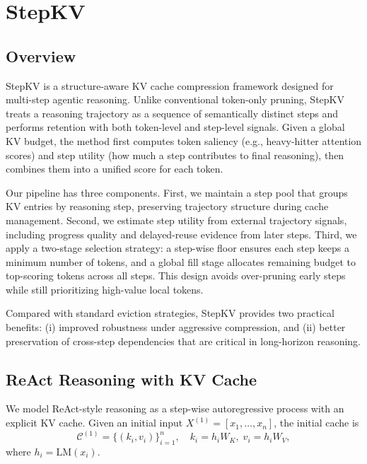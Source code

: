 \documentclass[11pt]{article}
\begin{document}
\section{StepKV}

\subsection{Overview}

StepKV is a structure-aware KV cache compression framework designed for multi-step agentic reasoning. Unlike conventional token-only pruning, StepKV treats a reasoning trajectory as a sequence of semantically distinct steps and performs retention with both token-level and step-level signals. Given a global KV budget, the method first computes token saliency (e.g., heavy-hitter attention scores) and step utility (how much a step contributes to final reasoning), then combines them into a unified score for each token.

Our pipeline has three components. First, we maintain a step pool that groups KV entries by reasoning step, preserving trajectory structure during cache management. Second, we estimate step utility from external trajectory signals, including progress quality and delayed-reuse evidence from later steps. Third, we apply a two-stage selection strategy: a step-wise floor ensures each step keeps a minimum number of tokens, and a global fill stage allocates remaining budget to top-scoring tokens across all steps. This design avoids over-pruning early steps while still prioritizing high-value local tokens.

Compared with standard eviction strategies, StepKV provides two practical benefits: (i) improved robustness under aggressive compression, and (ii) better preservation of cross-step dependencies that are critical in long-horizon reasoning.

\subsection{ReAct Reasoning with KV Cache}

We model ReAct-style reasoning as a step-wise autoregressive process with an explicit KV cache. Given an initial input $X^{(1)} = [x_1, \dots, x_n]$, the initial cache is
\begin{equation}
\mathcal{C}^{(1)} = \{(k_i, v_i)\}_{i=1}^{n}, \quad
k_i = h_i W_K,\; v_i = h_i W_V,
\end{equation}
where $h_i = \mathrm{LM}(x_i)$.
\end{document}
